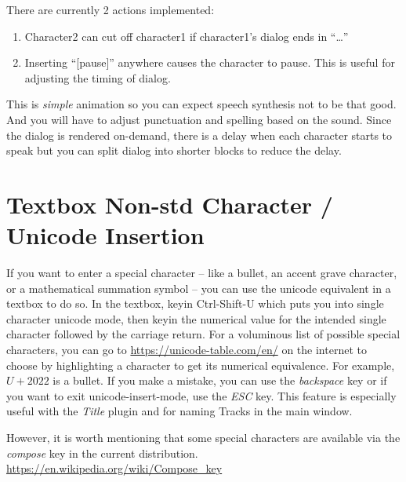 There are currently 2 actions implemented:

\begin{enumerate}
    \item Character2 can cut off character1 if character1's dialog ends in “\dots”
    \item Inserting “[pause]” anywhere causes the character to pause.  This is useful for adjusting the timing of dialog.
\end{enumerate}

This is \textit{simple} animation so you can expect speech synthesis not to be that good.  And you will have to adjust punctuation and spelling based on the sound.  Since the dialog is rendered on-demand, there is a delay when each character starts to speak but you can split dialog into shorter blocks to reduce the delay.

\section{Textbox Non-std Character / Unicode Insertion}%
\label{sec:textbox_non_std_character_unicode}

If you want to enter a special character -- like a bullet, an accent grave character, or a mathematical summation symbol -- you can use the unicode equivalent in a textbox to do so.  In the textbox, keyin Ctrl-Shift-U which puts you into single character unicode mode, then keyin the numerical value for the intended single character followed by the carriage return.  For a voluminous list of possible special characters, you can go to {\small \url{https://unicode-table.com/en/}} on the internet to choose by highlighting a character to get its numerical equivalence.  For example, $U+2022$ is a bullet.  If you make a mistake, you can use the \textit{backspace} key or if you want to exit unicode-insert-mode, use the \textit{ESC} key.  This feature is especially useful with the \textit{Title} plugin and for naming Tracks in the main window.

However, it is worth mentioning that some special characters are available via the \textit{compose} key in the current distribution. {\small \url{https://en.wikipedia.org/wiki/Compose_key}}

